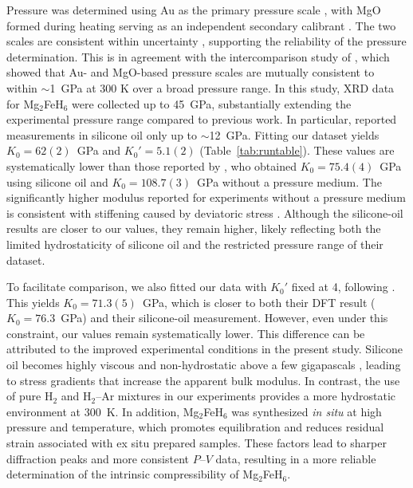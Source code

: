 \documentclass[draft,jgrga,12pt]{agujournal2019}
\begin{document}
Pressure was determined using Au as the primary pressure scale \cite{fei_internally_2007}, with MgO formed during heating serving as an independent secondary calibrant \cite{dorogokupets_equations_2007}. The two scales are consistent within uncertainty , supporting the reliability of the pressure determination. 
This is in agreement with the intercomparison study of , which showed that Au- and MgO-based pressure scales are mutually consistent to within $\sim$1~GPa at 300 K over a broad pressure range.
In this study, XRD data for Mg$_2$FeH$_6$ were collected up to 45~{GPa}, substantially extending the experimental pressure range compared to previous work. 
In particular,  reported measurements in silicone oil only up to $\sim$12~{GPa}. 
Fitting our dataset yields $K_0 = 62(2)$~GPa and $K_0' = 5.1(2)$ (Table~\ref{tab:runtable}). 
These values are systematically lower than those reported by , who obtained $K_0 = 75.4(4)$~{GPa} using silicone oil and $K_0 = 108.7(3)$~{GPa} without a pressure medium. 
The significantly higher modulus reported for experiments without a pressure medium is consistent with stiffening caused by deviatoric stress \cite{mao_theory_2007}. 
Although the silicone-oil results are closer to our values, they remain higher, likely reflecting both the limited hydrostaticity of silicone oil and the restricted pressure range of their dataset.

To facilitate comparison, we also fitted our data with $K_0'$ fixed at 4, following . 
This yields $K_0 = 71.3(5)$~{GPa}, which is closer to both their DFT result ($K_0 = 76.3$~{GPa}) and their silicone-oil measurement. However, even under this constraint, our values remain systematically lower. 
This difference can be attributed to the improved experimental conditions in the present study. 
Silicone oil becomes highly viscous and non-hydrostatic above a few gigapascals \cite{klotz_hydrostatic_2009}, leading to stress gradients that increase the apparent bulk modulus. In contrast, the use of pure H$_2$ and H$_2$–Ar mixtures in our experiments provides a more hydrostatic environment at 300~K. In addition, Mg$_2$FeH$_6$ was synthesized \textit{in situ} at high pressure and temperature, which promotes equilibration and reduces residual strain associated with ex situ prepared samples. These factors lead to sharper diffraction peaks and more consistent $P$–$V$ data, resulting in a more reliable determination of the intrinsic compressibility of Mg$_2$FeH$_6$.
\end{document}
